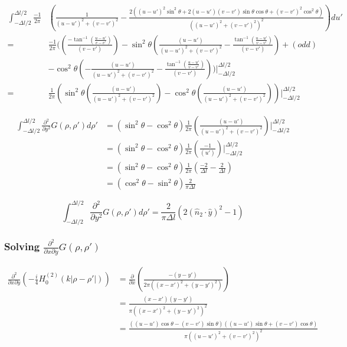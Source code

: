 \documentclass{article}
\newcommand{\0}{\varnothing}
\begin{document}
\begin{align*}
    \int_{-\Delta l/2}^{\Delta l/2}\frac{-1}{2\pi}&\left(\frac{1}{(u-u')^2+(v-v')^2} - \frac{2((u-u')^2\sin^2{\theta} + 2(u-u')(v-v')\sin{\theta}\cos{\theta}+(v-v')^2\cos^2{\theta})}{((u-u')^2+(v-v')^2)^2}\right)du'\\
    =&\frac{-1}{2\pi}(\left(\frac{-\tan^{-1}(\frac{u-u'}{v-v'})}{(v-v')}\right) - \sin^2{\theta}\left(\frac{(u-u')}{(u-u')^2 + (v-v')^2} - \frac{\tan^{-1}(\frac{u-u'}{v-v'})}{(v-v')}\right) + (odd)\\
        &-\cos^2{\theta}\left(-\frac{(u-u')}{(u-u')^2 + (v-v')^2} - \frac{\tan^{-1}(\frac{u-u'}{v-v'})}{(v-v')}\right))|_{-\Delta l/2}^{\Delta l/2}\\
    =&\frac{1}{2\pi}\left(\sin^2{\theta}\left(\frac{(u-u')}{(u-u')^2 + (v-v')^2}\right) -\cos^2{\theta}\left(\frac{(u-u')}{(u-u')^2 + (v-v')^2}\right)\right)|_{-\Delta l/2}^{\Delta l/2}
\end{align*}

\begin{align*}
    \int_{-\Delta l/2}^{\Delta l/2}\frac{\partial^2}{\partial y^2}G(\rho, \rho')d\rho' &= \left(\sin^2\theta - \cos^2\theta\right)\frac{1}{2\pi}\left(\frac{(u-u')}{(u-u')^2 + (v-v')^2}\right)|_{-\Delta l/2}^{\Delta l/2}\\
    &=\left(\sin^2\theta - \cos^2\theta\right)\frac{1}{2\pi}\left(\frac{-1}{(u')}\right)|_{-\Delta l/2}^{\Delta l/2}\\
    &=\left(\sin^2\theta - \cos^2\theta\right)\frac{1}{2\pi}\left(\frac{-2}{\Delta l} - \frac{2}{\Delta l}\right)\\
    &=\left(\cos^2\theta - \sin^2\theta\right)\frac{2}{\pi\Delta l}
\end{align*}

\begin{equation}
    \int_{-\Delta l/2}^{\Delta l/2}\frac{\partial^2}{\partial y^2}G(\rho, \rho')d\rho' = \frac{2}{\pi\Delta l}\left(2(\hat{n}_2 \cdot \hat{y})^2 - 1\right)
\end{equation}



\subsubsection{Solving $\frac{\partial^2}{\partial x\partial y}G(\rho,\rho')$}

\begin{align*}
    \frac{\partial^2}{\partial x\partial y}\left(-\frac{i}{4}H_0^{(2)}(k|\rho-\rho'|)\right) &= \frac{\partial}{\partial x}\left(\frac{-(y-y')}{2\pi((x-x')^2+(y-y')^2)}\right)\\
        &= \frac{(x-x')(y-y')}{\pi((x-x')^2 + (y-y')^2)^2}\\
        &= \frac{((u-u')\cos\theta - (v-v')\sin\theta)((u-u')\sin\theta + (v-v')\cos\theta)}{\pi((u-u')^2 + (v-v')^2)^2}
\end{align*}
\end{document}
